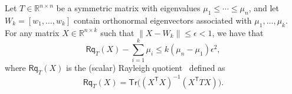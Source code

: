 \documentclass{siamart190516}
\newcommand{\Ttran}{\mathsf{T}}
\newcommand{\Tr}{\mathsf{Tr}}
\newcommand{\Rq}{\mathsf{Rq}}
\newcommand{\R}{\mathbb{R}}
\providecommand{\norm}[1]{\lVert#1\rVert}
\begin{document}
\begin{lemma}
    \label{lem:nonOrthX}
    Let $T\in\R^{n\times n}$ be a symmetric matrix with eigenvalues $\mu_{1}\leq \dotsb \leq \mu_{n}$, and let $W_{k}=[w_{1},\dotsc,w_{k}]$ contain orthonormal eigenvectors associated with $\mu_1,\ldots,\mu_k$. For any matrix $X \in \R^{n\times k}$ such that $\norm{X-W_{k}}\leq \epsilon<1$, we have that
    \begin{equation*}
        \Rq_{T}(X)-\sum_{i=1}^{k}\mu_{i}\leq k(\mu_{n}-\mu_{1})\epsilon^{2},
    \end{equation*}
    where $\Rq_{T}(X)$ is the (scalar) Rayleigh quotient~\cite[Eq. (4.2)]{absil2002grassmann}  defined as 
\begin{equation*}
    \Rq_{T}(X) = \Tr\bigl((X^{\Ttran}X)^{-1}(X^{\Ttran}TX)\bigr).
\end{equation*}
\end{lemma} 
\end{document}
